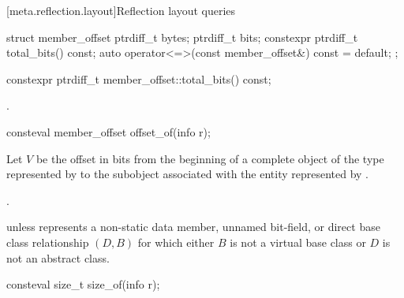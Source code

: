 [meta.reflection.layout]{Reflection layout queries}

%
%
\begin{itemdecl}
struct member_offset {
  ptrdiff_t bytes;
  ptrdiff_t bits;
  constexpr ptrdiff_t total_bits() const;
  auto operator<=>(const member_offset&) const = default;
};

constexpr ptrdiff_t member_offset::total_bits() const;
\end{itemdecl}

\begin{itemdescr}
\pnum
\returns
{}.
\end{itemdescr}

%
\begin{itemdecl}
consteval member_offset offset_of(info r);
\end{itemdecl}

\begin{itemdescr}
\pnum
Let $V$ be the offset in bits from the beginning of a complete object
of the type represented by 
to the subobject associated with the entity represented by .

\pnum
\returns
{}.

\pnum
\throws
{} unless
 represents a non-static data member,
unnamed bit-field, or
direct base class relationship $(D, B)$
for which either $B$ is not a virtual base class
or $D$ is not an abstract class.
\end{itemdescr}

%
\begin{itemdecl}
consteval size_t size_of(info r);
\end{itemdecl}


